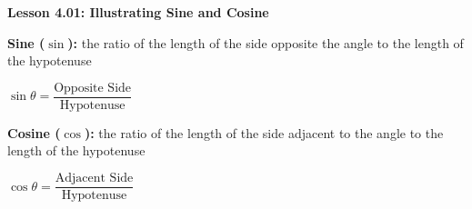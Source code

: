 \begin{center}
\textbf{Lesson 4.01: Illustrating Sine and Cosine}
\end{center}

\vspace*{-1.5ex}

\noindent \textbf{Sine ($\sin$):} the ratio of the length of the side opposite the angle to the length of the hypotenuse

{\centering $
    \sin \theta = \dfrac{\text{Opposite Side}}{\text{Hypotenuse}}
$\par}

\noindent \textbf{Cosine ($\cos$):} the ratio of the length of the side adjacent to the angle to the length of the hypotenuse

{\centering $
    \cos \theta = \dfrac{\text{Adjacent Side}}{\text{Hypotenuse}}
$\par}



